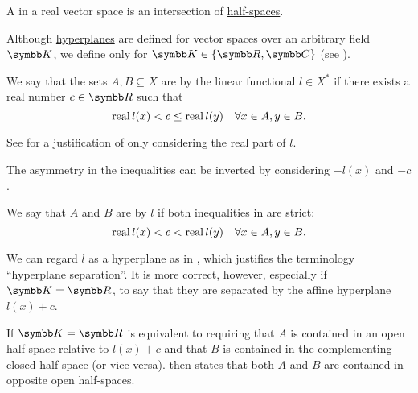 \begin{definition}\label{def:polyhedron}
  A  in a real vector space is an intersection of \hyperref[def:half_space]{half-spaces}.
\end{definition}

\begin{definition}\label{def:hyperplane_separation}
  Although \hyperref[def:hyperplane]{hyperplanes} are defined for vector spaces over an arbitrary field \( \BK \), we define  only for \( \BK \in \{ \BR, \BC \} \) (see ).

  We say that the sets \( A, B \subseteq X \) are  by the linear functional \( l \in X^* \) if there exists a real number \( c \in \BR \) such that
  \begin{equation}\label{def:hyperplane_separation/normal}
    \operatorname{real} l(x) < c \leq \operatorname{real} l(y) \quad\forall x \in A, y \in B.
  \end{equation}

  See  for a justification of only considering the real part of \( l \).

  The asymmetry in the inequalities  can be inverted by considering \( -l(x) \) and \( -c \).

  We say that \( A \) and \( B \) are  by \( l \) if both inequalities in  are strict:
  \begin{equation}\label{def:hyperplane_separation/strong}
    \operatorname{real} l(x) < c < \operatorname{real} l(y) \quad\forall x \in A, y \in B.
  \end{equation}

  We can regard \( l \) as a hyperplane as in , which justifies the terminology \enquote{hyperplane separation}. It is more correct, however, especially if \( \BK = \BR \), to say that they are separated by the affine hyperplane \( l(x) + c \).

  If \( \BK = \BR \)  is equivalent to requiring that \( A \) is contained in an open \hyperref[def:half_space]{half-space} relative to \( l(x) + c \) and that \( B \) is contained in the complementing closed half-space (or vice-versa).  then states that both \( A \) and \( B \) are contained in opposite open half-spaces.
\end{definition}

